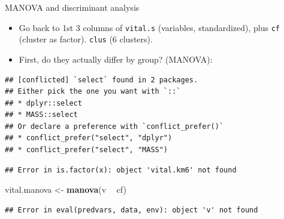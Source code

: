 \documentclass[ignorenonframetext,]{beamer}
\newenvironment{Shaded}{\begin{snugshade}}{\end{snugshade}}
\newcommand{\DecValTok}[1]{\textcolor[rgb]{0.00,0.00,0.81}{#1}}
\newcommand{\KeywordTok}[1]{\textcolor[rgb]{0.13,0.29,0.53}{\textbf{#1}}}
\newcommand{\NormalTok}[1]{#1}
\newcommand{\OperatorTok}[1]{\textcolor[rgb]{0.81,0.36,0.00}{\textbf{#1}}}
\newcommand{\StringTok}[1]{\textcolor[rgb]{0.31,0.60,0.02}{#1}}
\begin{document}
\begin{frame}[fragile]{MANOVA and discriminant analysis}
\protect\hypertarget{manova-and-discriminant-analysis}{}

\begin{itemize}
\item
  Go back to 1st 3 columns of \texttt{vital.s} (variables,
  standardized), plus \texttt{cf} (cluster as factor). \texttt{clus} (6
  clusters).
\item
  First, do they actually differ by group? (MANOVA):
\end{itemize}

\begin{Shaded}
\end{Shaded}

\begin{verbatim}
## [conflicted] `select` found in 2 packages.
## Either pick the one you want with `::` 
## * dplyr::select
## * MASS::select
## Or declare a preference with `conflict_prefer()`
## * conflict_prefer("select", "dplyr")
## * conflict_prefer("select", "MASS")
\end{verbatim}

\begin{Shaded}
\end{Shaded}

\begin{verbatim}
## Error in is.factor(x): object 'vital.km6' not found
\end{verbatim}

\begin{Shaded}
\begin{Highlighting}[]
\NormalTok{vital.manova <-}\StringTok{ }\KeywordTok{manova}\NormalTok{(v }\OperatorTok{~}\StringTok{ }\NormalTok{cf)}
\end{Highlighting}
\end{Shaded}

\begin{verbatim}
## Error in eval(predvars, data, env): object 'v' not found
\end{verbatim}


\end{frame}
\end{document}
